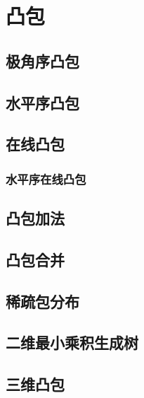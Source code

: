 \section{凸包}
\subsection{极角序凸包}
\subsection{水平序凸包}
\subsection{在线凸包}
\subsubsection{水平序在线凸包}
\subsection{凸包加法}
\subsection{凸包合并}
\subsection{稀疏包分布}
\subsection{二维最小乘积生成树}
\subsection{三维凸包}
